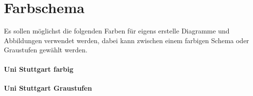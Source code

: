 \chapter{Farbschema}

Es sollen möglichst die folgenden Farben für eigens erstelle Diagramme und Abbildungen verwendet werden, dabei kann zwischen einem farbigen Schema oder Graustufen gewählt werden.

\subsubsection{Uni Stuttgart farbig}
\begin{testcolors}
\end{testcolors}

\subsubsection{Uni Stuttgart Graustufen}
\begin{testcolors}
\end{testcolors}